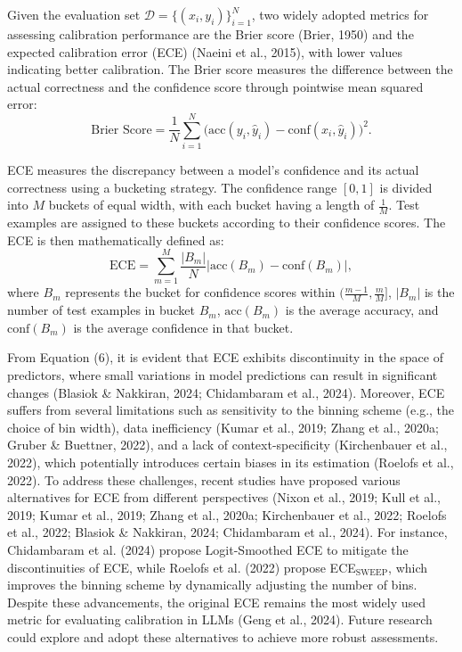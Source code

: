 Given the evaluation set $\mathcal{D} = \{(x_i, y_i)\}_{i=1}^{N}$, two widely adopted metrics for assessing calibration performance are the Brier score (Brier, 1950) and the expected calibration error (ECE) (Naeini et al., 2015), with lower values indicating better calibration. The Brier score measures the difference between the actual correctness and the confidence score through pointwise mean squared error:
\begin{equation}
\text{Brier Score} = \frac{1}{N} \sum_{i=1}^{N} \big(\text{acc}(y_i, \hat{y}_i) - \text{conf}(x_i, \hat{y}_i)\big)^2.
\end{equation}

ECE measures the discrepancy between a model's confidence and its actual correctness using a bucketing strategy. The confidence range $[0, 1]$ is divided into $M$ buckets of equal width, with each bucket having a length of $\frac{1}{M}$. Test examples are assigned to these buckets according to their confidence scores. The ECE is then mathematically defined as:
\begin{equation}
\text{ECE} = \sum_{m=1}^{M} \frac{|B_m|}{N} |\text{acc}(B_m) - \text{conf}(B_m)|,
\end{equation}
where $B_m$ represents the bucket for confidence scores within $(\frac{m-1}{M}, \frac{m}{M}]$, $|B_m|$ is the number of test examples in bucket $B_m$, $\text{acc}(B_m)$ is the average accuracy, and $\text{conf}(B_m)$ is the average confidence in that bucket.

From Equation (6), it is evident that ECE exhibits discontinuity in the space of predictors, where small variations in model predictions can result in significant changes (Blasiok \& Nakkiran, 2024; Chidambaram et al., 2024). Moreover, ECE suffers from several limitations such as sensitivity to the binning scheme (e.g., the choice of bin width), data inefficiency (Kumar et al., 2019; Zhang et al., 2020a; Gruber \& Buettner, 2022), and a lack of context-specificity (Kirchenbauer et al., 2022), which potentially introduces certain biases in its estimation (Roelofs et al., 2022). To address these challenges, recent studies have proposed various alternatives for ECE from different perspectives (Nixon et al., 2019; Kull et al., 2019; Kumar et al., 2019; Zhang et al., 2020a; Kirchenbauer et al., 2022; Roelofs et al., 2022; Blasiok \& Nakkiran, 2024; Chidambaram et al., 2024). For instance, Chidambaram et al. (2024) propose Logit-Smoothed ECE to mitigate the discontinuities of ECE, while Roelofs et al. (2022) propose ECE$_{\text{SWEEP}}$, which improves the binning scheme by dynamically adjusting the number of bins. Despite these advancements, the original ECE remains the most widely used metric for evaluating calibration in LLMs (Geng et al., 2024). Future research could explore and adopt these alternatives to achieve more robust assessments.

